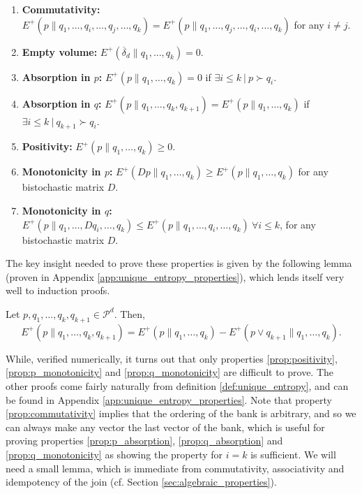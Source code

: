 \begin{enumerate}
    \item \textbf{Commutativity:} $E^+(p \parallel q_1, \dots, q_i, \dots, q_j, \dots, q_k) = E^+(p \parallel q_1, \dots, q_j, \dots, q_i, \dots, q_k)$ for any $i \neq j$. \label{prop:commutativity}
    \item \textbf{Empty volume:} $E^+(\overline{\delta}_d \parallel q_1, \dots, q_k) = 0$. \label{prop:empty}
    \item \textbf{Absorption in $p$:} $E^+(p \parallel q_1, \dots, q_k) = 0$ if $\exists i \leq k \: | \: p \succ q_i$. \label{prop:p_absorption}
    \item \textbf{Absorption in $q$:} $E^+(p \parallel q_1, \dots, q_k, q_{k+1}) = E^+(p \parallel q_1, \dots, q_k)$ if $\exists i \leq k \: | \: q_{k+1} \succ q_i$. \label{prop:q_absorption}
    \item \textbf{Positivity:} $E^+(p \parallel q_1, \dots, q_k) \geq 0$. \label{prop:positivity}
    \item \textbf{Monotonicity in $p$:} $E^+(Dp \parallel q_1, \dots, q_k) \geq E^+(p \parallel q_1, \dots, q_k)$ for any bistochastic matrix $D$. \label{prop:p_monotonicity}
    \item \textbf{Monotonicity in $q$:} $E^+(p \parallel q_1, \dots, Dq_i, \dots, q_k) \leq E^+(p \parallel q_1, \dots, q_i, \dots, q_k) \: \forall i \leq k$,  for any bistochastic matrix $D$. \label{prop:q_monotonicity}
\end{enumerate}

\noindent The key insight needed to prove these properties is given by the following lemma (proven in Appendix \ref{app:unique_entropy_properties}), which lends itself very well to induction proofs.

\begin{lemma} \label{lem:induction_trick}
    Let $p, q_1, \dots, q_k, q_{k+1} \in \mathcal{P}^d$. Then,
    \begin{equation}
        E^+(p \parallel q_1, \dots, q_k, q_{k+1}) = E^+(p \parallel q_1, \dots, q_k) - E^+(p \vee q_{k+1} \parallel q_1, \dots, q_k).
    \end{equation}
\end{lemma}

While, verified numerically, it turns out that only properties \ref{prop:positivity}, \ref{prop:p_monotonicity} and \ref{prop:q_monotonicity} are difficult to prove. The other proofs come fairly naturally from definition \ref{def:unique_entropy}, and can be found in Appendix \ref{app:unique_entropy_properties}. Note that property \ref{prop:commutativity} implies that the ordering of the bank is arbitrary, and so we can always make any vector the last vector of the bank, which is useful for proving properties \ref{prop:p_absorption}, \ref{prop:q_absorption} and \ref{prop:q_monotonicity} as showing the property for $i = k$ is sufficient. We will need a small lemma, which is immediate from commutativity, associativity and idempotency of the join (cf. Section \ref{sec:algebraic_properties}).

